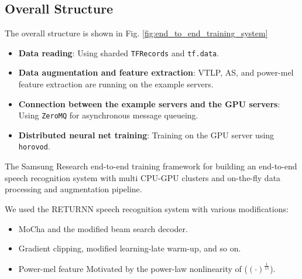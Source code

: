 \documentclass[a0,portrait]{a0poster}
\newenvironment{Figure}
  {\par\medskip\noindent\minipage{\linewidth}}
  {\endminipage\par\medskip}
\begin{document}
\begin{multicols}{2}
  \section{Overall Structure}
The overall structure is shown in Fig. \ref{fig:end_to_end_training_system}
\begin{itemize}
\item \textbf{Data reading}: Using sharded {\tt TFRecords} and {\tt tf.data}.
\item \textbf{Data augmentation and feature extraction}: VTLP, AS, and power-mel feature extraction are running on the example servers.
\item \textbf{Connection between the example servers and the GPU servers}: Using {\tt ZeroMQ} for asynchronous message queueing.
\item \textbf{Distributed neural net training}: Training on the GPU server using {\tt horovod}.
\end{itemize}
%
%
\begin{Figure}
  \begin{center}
    \resizebox{\textwidth}{!}{}
       { The Samsung Research end-to-end training framework for building an end-to-end
  speech recognition system with multi CPU-GPU clusters and on-the-fly data
  processing and augmentation pipeline.
     }
     \label{fig:end_to_end_training_system}
  \end{center}
\vspace{-5mm}
\end{Figure}
%
%
%
%
\begin{minipage}[]{0.45\linewidth}
  {
    \normalsize
  \begin{center}
  \resizebox{120mm}{!}{}
  \end{center}
  }
\end{minipage}
%
%
\begin{minipage}[]{0.54\linewidth}
  We used the RETURNN speech recognition system \cite{a_zeyer_interspeech_2018_00} with various modifications:
    \begin{itemize}
      \item{MoCha\cite{k_kim_asru_2019_00} and the modified beam search decoder.}
      \item{Gradient clipping, modified learning-late warm-up, and so on.}
      \item{Power-mel feature} Motivated by the power-law nonlinearity of ($(\cdot)^{\frac{1}{15}}$).

\end{itemize}
\end{minipage}
\end{multicols}
\end{document}
